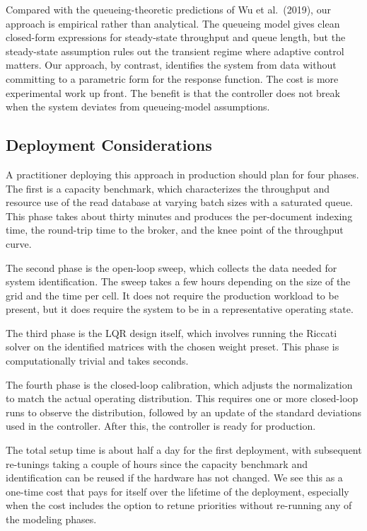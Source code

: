 \documentclass[10pt,a4paper]{article}
\begin{document}
Compared with the queueing-theoretic predictions of Wu et al.\ (2019), our approach is empirical rather than analytical. The queueing model gives clean closed-form expressions for steady-state throughput and queue length, but the steady-state assumption rules out the transient regime where adaptive control matters. Our approach, by contrast, identifies the system from data without committing to a parametric form for the response function. The cost is more experimental work up front. The benefit is that the controller does not break when the system deviates from queueing-model assumptions.

\subsection{Deployment Considerations}

A practitioner deploying this approach in production should plan for four phases. The first is a capacity benchmark, which characterizes the throughput and resource use of the read database at varying batch sizes with a saturated queue. This phase takes about thirty minutes and produces the per-document indexing time, the round-trip time to the broker, and the knee point of the throughput curve.

The second phase is the open-loop sweep, which collects the data needed for system identification. The sweep takes a few hours depending on the size of the grid and the time per cell. It does not require the production workload to be present, but it does require the system to be in a representative operating state.

The third phase is the LQR design itself, which involves running the Riccati solver on the identified matrices with the chosen weight preset. This phase is computationally trivial and takes seconds.

The fourth phase is the closed-loop calibration, which adjusts the normalization to match the actual operating distribution. This requires one or more closed-loop runs to observe the distribution, followed by an update of the standard deviations used in the controller. After this, the controller is ready for production.

The total setup time is about half a day for the first deployment, with subsequent re-tunings taking a couple of hours since the capacity benchmark and identification can be reused if the hardware has not changed. We see this as a one-time cost that pays for itself over the lifetime of the deployment, especially when the cost includes the option to retune priorities without re-running any of the modeling phases.
\end{document}
